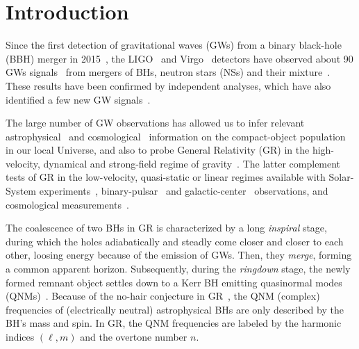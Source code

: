 \documentclass[twocolumn,
               prd,
               aps,
               superscriptaddress,
               tightenlines,
               nofootinbib,
               eqsecnum,
               amsfonts,
               amsmath,
               longbibliography]{revtex4-1}
\begin{document}
\section{Introduction}
\label{sec:intro}

Since the first detection of gravitational waves (GWs) from a binary black-hole (BBH) merger in 2015~\cite{LIGOScientific:2016aoc},
the LIGO~\cite{LIGOScientific:2014pky} and Virgo~\cite{VIRGO:2014yos} detectors have observed about 90 GWs signals~\cite{LIGOScientific:2021djp} from mergers
of BHs, neutron stars (NSs) \cite{TheLIGOScientific:2017qsa,LIGOScientific:2018cki,LIGOScientific:2020aai} and their mixture~\cite{LIGOScientific:2021qlt}. These results have been confirmed
by independent analyses, which have also identified a few new GW signals~\cite{Nitz:2018imz,Nitz:2019hdf,Venumadhav:2019lyq,Zackay:2019btq,Nitz:2021zwj,Olsen:2022pin}.

The large number of GW observations has allowed us to infer relevant astrophysical~\cite{LIGOScientific:2021aug} and cosmological~\cite{LIGOScientific:2021psn} information on the compact-object population in our local Universe, and also to probe General Relativity (GR) in the high-velocity, dynamical and strong-field regime of gravity~\cite{LIGOScientific:2021sio}. The latter complement tests of GR in the low-velocity, quasi-static or linear regimes available with Solar-System experiments~\cite{Will:2014kxa}, binary-pulsar~\cite{Wex:2014nva,Kramer:2021jcw} and galactic-center~\cite{GRAVITY:2018ofz,Do:2019txf,EventHorizonTelescope:2019ths} observations,
and cosmological measurements~\cite{Clifton:2011jh}.

The coalescence of two BHs in GR is characterized by a long \textit{inspiral} stage, during which the
holes adiabatically and steadly come closer and closer to each other, loosing energy because of the emission
of GWs. Then, they \textit{merge}, forming a common apparent horizon. Subsequently, during the \textit{ringdown} stage, the newly formed remnant object settles down to a Kerr BH emitting quasinormal modes (QNMs)~\cite{Vishveshwara:1970cc,Press:1971wr,Chandrasekhar:1975zza}. Because of the no-hair conjecture in GR~\cite{Carter:1971zc,Israel:1967wq,Hawking:1971vc,Robinson:1975bv}, the QNM (complex) frequencies of (electrically neutral) astrophysical BHs are only described by the BH's mass and spin. In GR, the QNM frequencies are labeled by the harmonic indices $(\ell,m)$ and the overtone number $n$.
\end{document}
